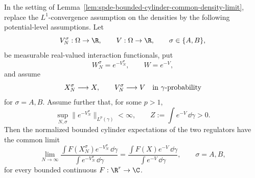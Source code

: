 \begin{corollary}
\label{cor:spde-bounded-cylinder-common-potential}
In the setting of
Lemma~\ref{lem:spde-bounded-cylinder-common-density-limit}, replace
the \(L^1\)-convergence assumption on the densities by the following
potential-level assumptions.  Let
\[
  V_N^\sigma:\Omega\to\R,\qquad V:\Omega\to\R,
  \qquad \sigma\in\{A,B\},
\]
be measurable real-valued interaction functionals, put
\[
  W_N^\sigma=e^{-V_N^\sigma},\qquad W=e^{-V},
\]
and assume
\begin{equation}
  X_N^\sigma\longrightarrow X,
  \qquad
  V_N^\sigma\longrightarrow V
  \quad\hbox{in }\gamma\hbox{-probability}
  \label{eq:spde-common-potential-convergence}
\end{equation}
for \(\sigma=A,B\).  Assume further that, for some \(p>1\),
\begin{equation}
  \sup_{N,\sigma}\|e^{-V_N^\sigma}\|_{L^p(\gamma)}<\infty,
  \qquad
  Z:=\int e^{-V}\,\dd\gamma>0 .
  \label{eq:spde-common-potential-lp-stability}
\end{equation}
Then the normalized bounded cylinder expectations of the two regulators
have the common limit
\begin{equation}
  \lim_{N\to\infty}
  \frac{\int F(X_N^\sigma)e^{-V_N^\sigma}\,\dd\gamma}
       {\int e^{-V_N^\sigma}\,\dd\gamma}
  =
  \frac{\int F(X)e^{-V}\,\dd\gamma}
       {\int e^{-V}\,\dd\gamma},
  \qquad
  \sigma=A,B,
  \label{eq:spde-common-potential-cylinder-limit}
\end{equation}
for every bounded continuous \(F:\R^r\to\C\).
\end{corollary}

